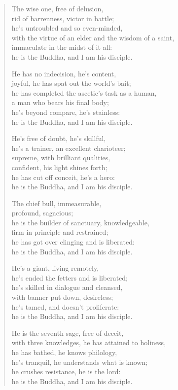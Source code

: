 \documentclass[12pt,openany]{book}%
\begin{document}
\begin{verse}%
The wise one, free of delusion, \\
rid of barrenness, victor in battle; \\
he’s untroubled and so even-minded, \\
with the virtue of an elder and the wisdom of a saint, \\
immaculate in the midst of it all: \\
he is the Buddha, and I am his disciple. 

He has no indecision, he’s content, \\
joyful, he has spat out the world’s bait; \\
he has completed the ascetic’s task as a human, \\
a man who bears his final body; \\
he’s beyond compare, he’s stainless: \\
he is the Buddha, and I am his disciple. 

He’s free of doubt, he’s skillful, \\
he’s a trainer, an excellent charioteer; \\
supreme, with brilliant qualities, \\
confident, his light shines forth; \\
he has cut off conceit, he’s a hero: \\
he is the Buddha, and I am his disciple. 

The chief bull, immeasurable, \\
profound, sagacious; \\
he is the builder of sanctuary, knowledgeable, \\
firm in principle and restrained; \\
he has got over clinging and is liberated: \\
he is the Buddha, and I am his disciple. 

He’s a giant, living remotely, \\
he’s ended the fetters and is liberated; \\
he’s skilled in dialogue and cleansed, \\
with banner put down, desireless; \\
he’s tamed, and doesn’t proliferate: \\
he is the Buddha, and I am his disciple. 

He is the seventh sage, free of deceit, \\
with three knowledges, he has attained to holiness, \\
he has bathed, he knows philology, \\
he’s tranquil, he understands what is known; \\
he crushes resistance, he is the lord: \\
he is the Buddha, and I am his disciple. 


\end{verse}
\end{document}

